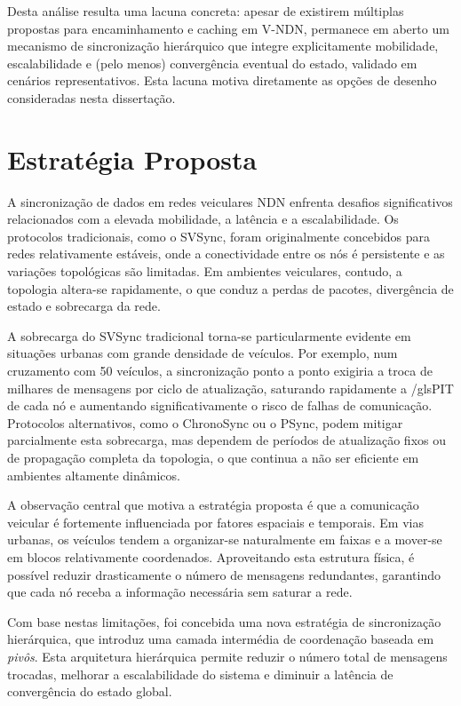 Desta análise resulta uma lacuna concreta: apesar de existirem múltiplas propostas para encaminhamento e caching em \gls{V-NDN}, permanece em aberto um mecanismo de sincronização hierárquico que integre explicitamente mobilidade, escalabilidade e (pelo menos) convergência eventual do estado, validado em cenários representativos. Esta lacuna motiva diretamente as opções de desenho consideradas nesta dissertação.


\chapter{Estratégia Proposta}
\label{chap:estrategia}

A sincronização de dados em redes veiculares \gls{NDN} enfrenta desafios significativos relacionados com a elevada mobilidade, a latência e a escalabilidade. Os protocolos tradicionais, como o \gls{SVSync}, foram originalmente concebidos para redes relativamente estáveis, onde a conectividade entre os nós é persistente e as variações topológicas são limitadas. Em ambientes veiculares, contudo, a topologia altera-se rapidamente, o que conduz a perdas de pacotes, divergência de estado e sobrecarga da rede.

A sobrecarga do \gls{SVSync} tradicional torna-se particularmente evidente em situações urbanas com grande densidade de veículos. Por exemplo, num cruzamento com 50 veículos, a sincronização ponto a ponto exigiria a troca de milhares de mensagens por ciclo de atualização, saturando rapidamente a /gls{PIT} de cada nó e aumentando significativamente o risco de falhas de comunicação. Protocolos alternativos, como o ChronoSync ou o PSync, podem mitigar parcialmente esta sobrecarga, mas dependem de períodos de atualização fixos ou de propagação completa da topologia, o que continua a não ser eficiente em ambientes altamente dinâmicos.

A observação central que motiva a estratégia proposta é que a comunicação veicular é fortemente influenciada por fatores espaciais e temporais. Em vias urbanas, os veículos tendem a organizar-se naturalmente em faixas e a mover-se em blocos relativamente coordenados. Aproveitando esta estrutura física, é possível reduzir drasticamente o número de mensagens redundantes, garantindo que cada nó receba a informação necessária sem saturar a rede.

Com base nestas limitações, foi concebida uma nova estratégia de sincronização hierárquica, que introduz uma camada intermédia de coordenação baseada em \textit{pivôs}. Esta arquitetura hierárquica permite reduzir o número total de mensagens trocadas, melhorar a escalabilidade do sistema e diminuir a latência de convergência do estado global.

